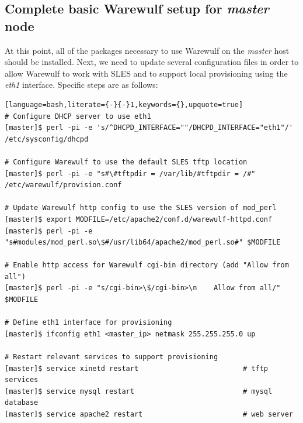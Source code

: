 \documentclass[letterpaper]{article}
\begin{document}
\subsection{Complete basic Warewulf setup for {\em master} node}

At this point, all of the packages necessary to use Warewulf on the {\em
  master} host should be installed.  Next, we need to update several
configuration files in order to allow Warewulf to work with SLES and to support
local provisioning using the {\em eth1} interface.  Specific steps are as
follows:


\begin{lstlisting}[language=bash,literate={-}{-}1,keywords={},upquote=true]
# Configure DHCP server to use eth1
[master]$ perl -pi -e 's/^DHCPD_INTERFACE=""/DHCPD_INTERFACE="eth1"/' /etc/sysconfig/dhcpd

# Configure Warewulf to use the default SLES tftp location
[master]$ perl -pi -e "s#\#tftpdir = /var/lib/#tftpdir = /#" /etc/warewulf/provision.conf

# Update Warewulf http config to use the SLES version of mod_perl
[master]$ export MODFILE=/etc/apache2/conf.d/warewulf-httpd.conf
[master]$ perl -pi -e "s#modules/mod_perl.so\$#/usr/lib64/apache2/mod_perl.so#" $MODFILE

# Enable http access for Warewulf cgi-bin directory (add "Allow from all")
[master]$ perl -pi -e "s/cgi-bin>\$/cgi-bin>\n    Allow from all/" $MODFILE

# Define eth1 interface for provisioning
[master]$ ifconfig eth1 <master_ip> netmask 255.255.255.0 up

# Restart relevant services to support provisioning
[master]$ service xinetd restart                         # tftp services
[master]$ service mysql restart                          # mysql database
[master]$ service apache2 restart                        # web server
\end{lstlisting}

\end{document}
